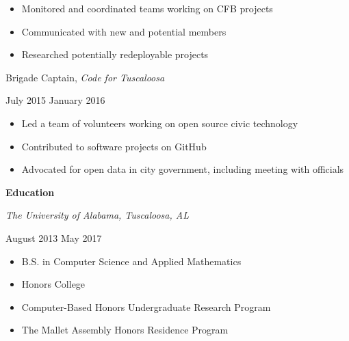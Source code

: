 \documentclass[11pt]{article}
\begin{document}
\begin{itemize}
  \item Monitored and coordinated teams working on CFB projects
  \item Communicated with new and potential members
  \item Researched potentially redeployable projects
\end{itemize}

\begin{minipage}[t]{0.65\textwidth}
\flushleft
Brigade Captain, \textit{Code for Tuscaloosa}\\
\end{minipage}
\begin{minipage}[t]{0.30\textwidth}
\flushright
July 2015 \space \textemdash \space January 2016\\
\end{minipage}

\begin{itemize}
  \item Led a team of volunteers working on open source civic technology
  \item Contributed to software projects on GitHub
  \item Advocated for open data in city government, including meeting with officials
\end{itemize}

\vspace{0.8em}
\hbox{\large \textbf{Education}}

\begin{minipage}[t]{0.65\textwidth}
\flushleft
\textit{The University of Alabama, Tuscaloosa, AL}\\
\end{minipage}
\begin{minipage}[t]{0.30\textwidth}
\flushright
August 2013 \space \textemdash \space May 2017\\
\end{minipage}

\begin{itemize}
  \item B.S. in Computer Science and Applied Mathematics
  \item Honors College
  \item Computer-Based Honors Undergraduate Research Program
  \item The Mallet Assembly Honors Residence Program
\end{itemize}
\end{document}
